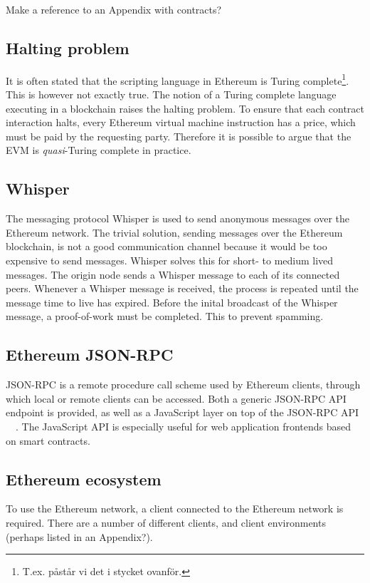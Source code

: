 Make a reference to an Appendix with contracts?


\subsection{Halting problem}
It is often stated that the scripting language in Ethereum is Turing complete\footnote{T.ex. påstår vi det i stycket ovanför.}. This is however not exactly true. The notion of a Turing complete language executing in a blockchain raises the halting problem. To ensure that each contract interaction halts, every Ethereum virtual machine instruction has a price, which must be paid by the requesting party. Therefore it is possible to argue that the EVM is \emph{quasi}-Turing complete in practice.

\subsection{Whisper}
The messaging protocol Whisper is used to send anonymous messages over the Ethereum network. The trivial solution, sending messages over the Ethereum blockchain, is not a good communication channel because it would be too expensive to send messages. Whisper solves this for short- to medium lived messages. The origin node sends a Whisper message to each of its connected peers. Whenever a Whisper message is received, the process is repeated until the message time to live has expired. Before the inital broadcast of the Whisper message, a proof-of-work must be completed. This to prevent spamming.

\subsection{Ethereum JSON-RPC}
JSON-RPC is a remote procedure call scheme used by Ethereum clients, through which local or remote clients can be accessed. Both a generic JSON-RPC API endpoint is provided, as well as a JavaScript layer on top of the JSON-RPC API ~\cite{generic-json-rpc}~\cite{javascript-api}. The JavaScript API is especially useful for web application frontends based on smart contracts.

\subsection{Ethereum ecosystem}
To use the Ethereum network, a client connected to the Ethereum network is required. There are a number of different clients, and client environments (perhaps listed in an Appendix?).

